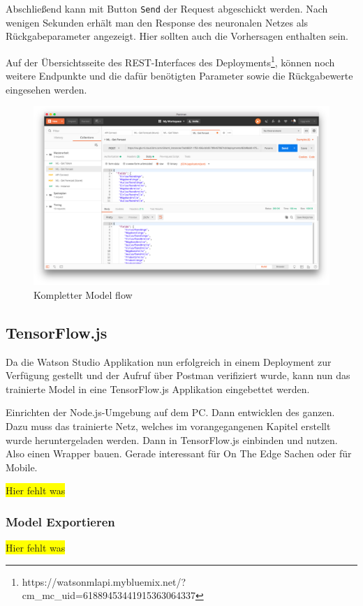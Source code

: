 Abschließend kann mit Button \texttt{Send} der Request abgeschickt werden. Nach wenigen Sekunden erhält man den Response
des neuronalen Netzes als Rückgabeparameter angezeigt. Hier sollten auch die Vorhersagen enthalten sein.

Auf der Übersichtsseite des REST-Interfaces des
Deployments\footnote{https://watson\-ml\-api.mybluemix.net/?cm\_mc\_uid=61889453441915363064337}, können noch weitere
Endpunkte und die dafür benötigten Parameter sowie die Rückgabewerte eingesehen werden.

\begin{figure}[h]
    \centering
    \includegraphics[scale=0.26]{images/kapitel_3/deployment_postman.png}
    \caption{Kompletter Model flow}
    \label{fig:umsetzung_deployment_postman}
\end{figure}

\subsection{TensorFlow.js}
Da die Watson Studio Applikation nun erfolgreich in einem Deployment zur Verfügung gestellt und der Aufruf über
Postman verifiziert wurde, kann nun das trainierte Model in eine TensorFlow.js Applikation eingebettet werden.

Einrichten der Node.js-Umgebung auf dem PC. Dann entwicklen des ganzen. Dazu muss das trainierte Netz, welches im
vorangegangenen Kapitel erstellt wurde heruntergeladen werden. Dann in TensorFlow.js einbinden und nutzen. Also einen
Wrapper bauen. Gerade interessant für On The Edge Sachen oder für Mobile.

\colorbox{yellow}{Hier fehlt was}

\subsubsection{Model Exportieren}
\colorbox{yellow}{Hier fehlt was}

